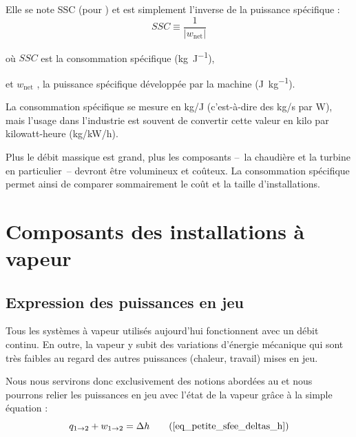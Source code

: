 		Elle se note SSC (pour ) et est simplement l’inverse de la puissance spécifique :
		\begin{equation}
			\mathit{SSC} \equiv  \frac{1}{|w_\text{net}|}
		\end{equation}

		\begin{equationterms}
			\item où \tab $SSC$ \tab est la consommation spécifique (\si{\kilogram\per\joule}),
			\item et \tab $w_\text{net}$ \tab, la puissance spécifique développée par la machine (\si{\joule\per\kilogram}).
		\end{equationterms}

		La consommation spécifique se mesure en \si[per-mode = symbol]{\kilogram\per\joule} (c’est-à-dire des \si[per-mode = symbol]{\kilogram\per\second} par \si{\watt}), mais l’usage dans l’industrie est souvent de convertir cette valeur en kilo par kilowatt-heure (\si[per-mode = symbol]{\kilogram\per\kilo\watt\per\hour}).

		Plus le débit massique est grand, plus les composants --\ la chaudière et la turbine en particulier\ --   devront être volumineux et coûteux. La consommation spécifique permet ainsi de comparer sommairement le coût et la taille d’installations.



\section{Composants des installations à vapeur}



	\subsection{Expression des puissances en jeu}
	\label{ch_expressions_puissances_vapeur}

		Tous les systèmes à vapeur utilisés aujourd’hui fonctionnent avec un débit continu. En outre, la vapeur y subit des variations d’énergie mécanique qui sont très faibles au regard des autres puissances (chaleur, travail) mises en jeu.

		Nous nous servirons donc exclusivement des notions abordées au \courstrois et nous pourrons relier les puissances en jeu avec l’état de la vapeur grâce à la simple équation :
		\begin{equation}
				q_{1 \to 2} + w_{1 \to 2} = \Delta h 	\tag{\ref{eq_petite_sfee_deltas_h}}
		\end{equation}

